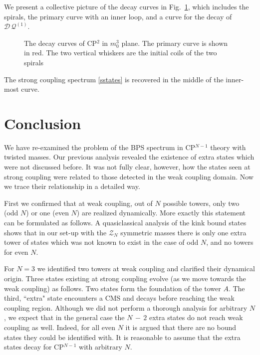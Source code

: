 \documentclass[epsfig,12pt]{article}
\newcommand{\mc}[1]{\mathcal{#1}}
\newcommand{\Q}{\mathcal{Q}}
\newcommand{\D}{\mathcal{D}}
\begin{document}
	We present a collective picture of the decay curves in Fig.~\ref{fdecays}, which includes the spirals, the 
	primary curve with an inner loop, and a curve for the decay of $ \D\,\Q^{(1)} $.
\begin{figure}
\begin{center}
\epsfxsize=8.0cm
\caption{\small The decay curves of CP$^2$ in $ m_0^3 $ plane. 
		The primary curve is shown in red.
		The two vertical whiskers are the initial coils of the two spirals}
\label{fdecays}
\end{center}
\end{figure}
	The strong coupling spectrum \eqref{sstates} is recovered in the middle of the inner-most curve.	

\newpage

\section{Conclusion}
\label{conclu}
\setcounter{equation}{0}

	We have re-examined the problem of the BPS spectrum in CP$^{N-1}$ theory with twisted masses.
	Our previous analysis \cite{Bolokhov:2011mp} revealed the existence of extra states which were not discussed 
	before.
	It was not fully clear, however, how the states seen at strong coupling were related to those detected 
	in the weak coupling domain. Now we trace their relationship in a detailed way. 
	
	First we confirmed that at weak coupling, out of $N$ possible towers, only two
	(odd $N$) or one (even $N$) are realized dynamically. 
	More exactly this statement can be formulated as follows. A quasiclassical analysis of 
	the kink bound states  shows that in our set-up
	with the $ \mc{Z}_N $ symmetric masses there is only one extra tower of states which was not known to exist
	in the case of odd $ N $, and no towers for even $ N $.
	
	For $N=3$ we identified two towers at weak coupling and clarified their dynamical origin. 
	Three states existing at strong coupling evolve (as we move towards the weak coupling) as follows. 
	Two states form the foundation of the tower $ A $. 
	The third, ``extra" state encounters a CMS and decays before reaching the weak coupling region.
	Although we did not perform a thorough analysis for arbitrary $ N $, we expect 
	that in the general case the $ N \,-\, 2 $ extra states do not reach weak coupling as well.
	Indeed, for all even $ N $ it is argued that there are no bound states they could be identified with.
	It is reasonable to assume that the extra states decay for CP$^{N-1}$ with arbitrary $ N $.
\end{document}
